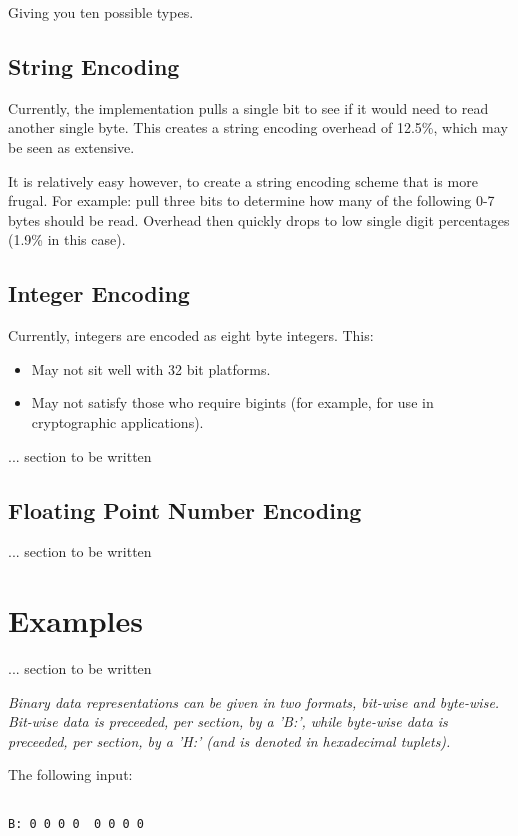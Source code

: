 Giving you ten possible types.

\subsection{String Encoding}

Currently, the implementation pulls a single bit to see if it would need
to read another single byte. This creates a string encoding overhead of
12.5\%, which may be seen as extensive.

It is relatively easy however, to create a string encoding scheme that
is more frugal. For example: pull three bits to determine how many of the
following 0-7 bytes should be read. Overhead then quickly drops to low
single digit percentages (1.9\% in this case).

\subsection{Integer Encoding}

Currently, integers are encoded as eight byte integers. This:

\begin{itemize}
\item May not sit well with 32 bit platforms.
\item May not satisfy those who require bigints (for example, for use in
      cryptographic applications).
\end{itemize}

... section to be written

\subsection{Floating Point Number Encoding}

... section to be written

\section{Examples}

... section to be written

\textit{
Binary data representations can be given in two formats, bit-wise and byte-wise.
Bit-wise data is preceeded, per section, by a 'B:',
while byte-wise data is preceeded, per section, by a 'H:' (and is denoted in
hexadecimal tuplets).
}

The following input:

\begin{changemargin}{-60mm}{0mm}
\begin{myquote}
\begin{verbatim}

B: 0 0 0 0  0 0 0 0

\end{verbatim}
\end{myquote}
\end{changemargin}

